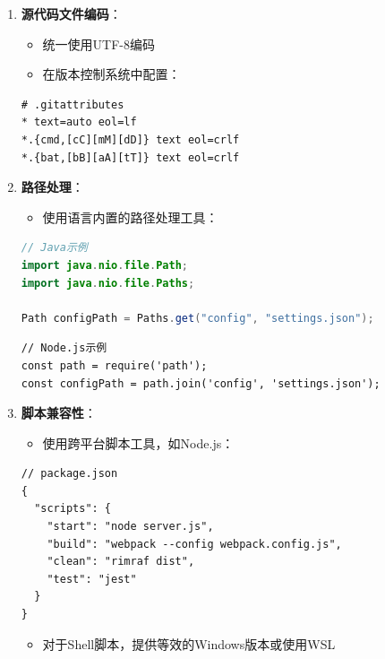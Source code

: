 \begin{enumerate}
\def\labelenumi{\arabic{enumi}.}
\tightlist
\item
  \textbf{源代码文件编码}：

  \begin{itemize}
  \tightlist
  \item
    统一使用UTF-8编码
  \item
    在版本控制系统中配置：
  \end{itemize}

\begin{lstlisting}
# .gitattributes
* text=auto eol=lf
*.{cmd,[cC][mM][dD]} text eol=crlf
*.{bat,[bB][aA][tT]} text eol=crlf
\end{lstlisting}
\item
  \textbf{路径处理}：

  \begin{itemize}
  \tightlist
  \item
    使用语言内置的路径处理工具：
  \end{itemize}

\begin{lstlisting}[language=Java]
// Java示例
import java.nio.file.Path;
import java.nio.file.Paths;

Path configPath = Paths.get("config", "settings.json");
\end{lstlisting}

\begin{lstlisting}
// Node.js示例
const path = require('path');
const configPath = path.join('config', 'settings.json');
\end{lstlisting}
\item
  \textbf{脚本兼容性}：

  \begin{itemize}
  \tightlist
  \item
    使用跨平台脚本工具，如Node.js：
  \end{itemize}

\begin{lstlisting}
// package.json
{
  "scripts": {
    "start": "node server.js",
    "build": "webpack --config webpack.config.js",
    "clean": "rimraf dist",
    "test": "jest"
  }
}
\end{lstlisting}

  \begin{itemize}
  \tightlist
  \item
    对于Shell脚本，提供等效的Windows版本或使用WSL
  \end{itemize}
\end{enumerate}

